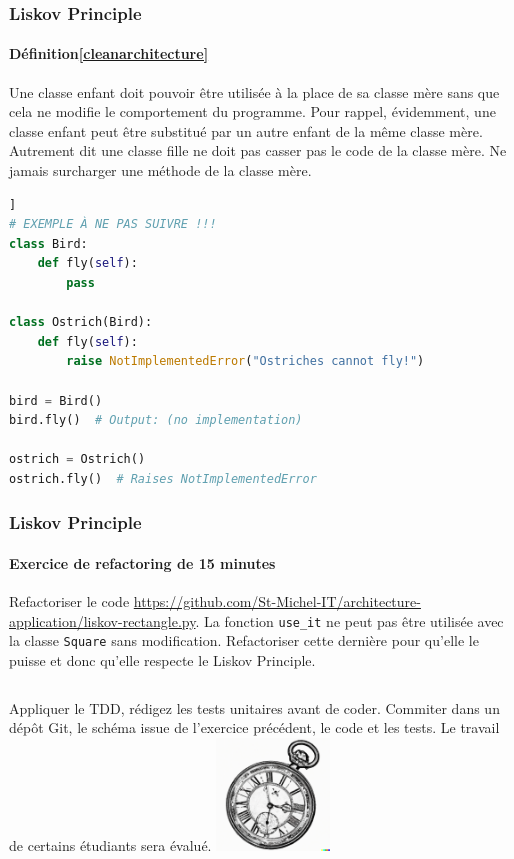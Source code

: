 \documentclass{beamer}
\begin{document}
    \begin{frame}[fragile]
        \transdissolve
        \frametitle{Liskov Principle}
        \framesubtitle{Définition\cref{cleanarchitecture}}
        Une classe enfant doit pouvoir être utilisée à la place de sa classe mère sans que cela ne modifie le comportement du programme.
        \bigbreak
        Pour rappel, évidemment, une classe enfant peut être substitué par un autre enfant de la même classe mère.
        \bigbreak
        Autrement dit une classe fille ne doit pas casser pas le code de la classe mère.
        Ne jamais surcharger une méthode de la classe mère.
        \begin{lstlisting}[language=python,basicstyle=\ttfamily\tiny]]
# EXEMPLE À NE PAS SUIVRE !!!
class Bird:
    def fly(self):
        pass

class Ostrich(Bird):
    def fly(self):
        raise NotImplementedError("Ostriches cannot fly!")

bird = Bird()
bird.fly()  # Output: (no implementation)

ostrich = Ostrich()
ostrich.fly()  # Raises NotImplementedError
        \end{lstlisting}
    \end{frame}

    \begin{frame}
        \transdissolve
        \frametitle{Liskov Principle}
        \framesubtitle{Exercice \execcounterdispinc{} de refactoring de 15 minutes}
        Refactoriser le code \url{https://github.com/St-Michel-IT/architecture-application/liskov-rectangle.py}.
        La fonction \lstinline{use_it} ne peut pas être utilisée avec la classe \lstinline{Square} sans modification.
        Refactoriser cette dernière pour qu'elle le puisse et donc qu'elle respecte le Liskov Principle.
        \bigbreak
        \begin{columns}
            Appliquer le TDD, rédigez les tests unitaires avant de coder.
            \bigbreak
            Commiter dans un dépôt Git, le schéma issue de l'exercice précédent, le code et les tests.
            \bigbreak
            Le travail de certains étudiants sera évalué.
            \centering
            \includegraphics[width=3cm]{image/engraving-of-an-old-watch}
        \end{columns}
    \end{frame}
\end{document}
